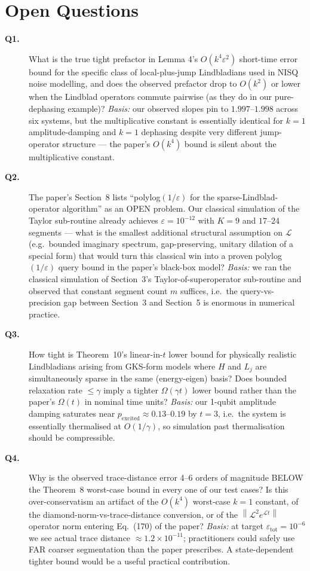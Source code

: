 \documentclass[11pt]{article}
\newcommand{\opnorm}[1]{\left\lVert #1 \right\rVert}
\begin{document}
\section{Open Questions}

\begin{description}
\item[\textbf{Q1.}] What is the true tight prefactor in Lemma 4's $O(k^4 \varepsilon^2)$ short-time error bound for the specific class of local-plus-jump Lindbladians used in NISQ noise modelling, and does the observed prefactor drop to $O(k^2)$ or lower when the Lindblad operators commute pairwise (as they do in our pure-dephasing example)? \emph{Basis:} our observed slopes pin to $1.997$--$1.998$ across six systems, but the multiplicative constant is essentially identical for $k=1$ amplitude-damping and $k=1$ dephasing despite very different jump-operator structure --- the paper's $O(k^4)$ bound is silent about the multiplicative constant.
\item[\textbf{Q2.}] The paper's Section~8 lists ``polylog$(1/\varepsilon)$ for the sparse-Lindblad-operator algorithm'' as an OPEN problem. Our classical simulation of the Taylor sub-routine already achieves $\varepsilon = 10^{-12}$ with $K=9$ and $17$--$24$ segments --- what is the smallest additional structural assumption on $\mathcal{L}$ (e.g.\ bounded imaginary spectrum, gap-preserving, unitary dilation of a special form) that would turn this classical win into a proven polylog$(1/\varepsilon)$ query bound in the paper's black-box model? \emph{Basis:} we ran the classical simulation of Section~3's Taylor-of-superoperator sub-routine and observed that constant segment count $m$ suffices, i.e.\ the query-vs-precision gap between Section~3 and Section~5 is enormous in numerical practice.
\item[\textbf{Q3.}] How tight is Theorem~10's linear-in-$t$ lower bound for physically realistic Lindbladians arising from GKS-form models where $H$ and $L_j$ are simultaneously sparse in the same (energy-eigen) basis? Does bounded relaxation rate $\le \gamma$ imply a tighter $\Omega(\gamma t)$ lower bound rather than the paper's $\Omega(t)$ in nominal time units? \emph{Basis:} our 1-qubit amplitude damping saturates near $p_{\text{excited}} \approx 0.13$--$0.19$ by $t=3$, i.e.\ the system is essentially thermalised at $O(1/\gamma)$, so simulation past thermalisation should be compressible.
\item[\textbf{Q4.}] Why is the observed trace-distance error 4--6 orders of magnitude BELOW the Theorem~8 worst-case bound in every one of our test cases? Is this over-conservatism an artifact of the $O(k^4)$ worst-case $k=1$ constant, of the diamond-norm-vs-trace-distance conversion, or of the $\opnorm{\mathcal{L}^2 e^{\mathcal{L}t}}$ operator norm entering Eq.~(170) of the paper? \emph{Basis:} at target $\varepsilon_{\text{tot}} = 10^{-6}$ we see actual trace distance $\approx 1.2 \times 10^{-11}$; practitioners could safely use FAR coarser segmentation than the paper prescribes. A state-dependent tighter bound would be a useful practical contribution.

\end{description}
\end{document}
